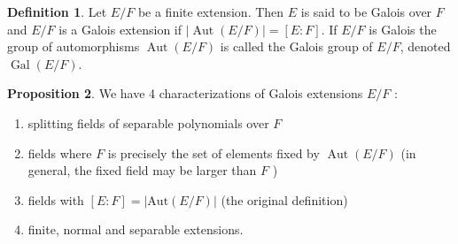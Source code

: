\documentclass[a4paper,12pt]{article}
\theoremstyle{definition}
\newtheorem{defn}{Definition}[subsection]
\newtheorem{prop}[defn]{Proposition}
\begin{document}
\begin{defn}
    Let $E/F$ be a finite extension. Then $E$ is said to be Galois over $F$ and $E/F$ is a Galois extension if $|\operatorname{Aut}(E/F)|=[E: F]$.  If $E/ F$ is Galois the group of automorphisms $\operatorname{Aut}(E/F)$ is called the Galois group of $E/F$, denoted $\operatorname{Gal}(E/F)$.
\end{defn}
\begin{prop}
    We have 4 characterizations of Galois extensions $E/F$ :
    \begin{enumerate}[(1)]
        \item splitting fields of separable polynomials over $F$
        \item fields where $F$ is precisely the set of elements fixed by $\operatorname{Aut}(E/F)$ (in general, the fixed field may be larger than $F$ )
        \item fields with $[E: F]=|\text{Aut}(E/F)|$ (the original definition)
        \item finite, normal and separable extensions.
    \end{enumerate}
\end{prop}
\end{document}
